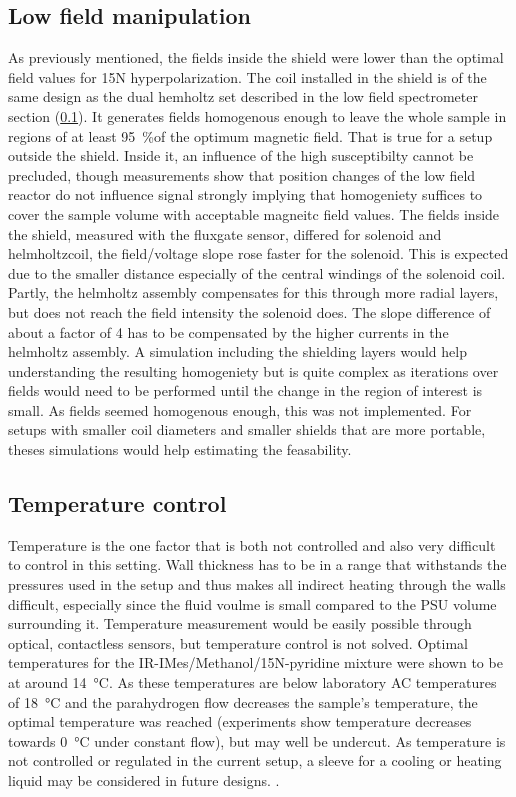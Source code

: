         \subsection{Low field manipulation}
            As previously mentioned, the fields inside the shield were lower than the optimal field values for 15N hyperpolarization. The coil installed in the shield is of the same design as the dual hemholtz set described in the low field spectrometer section (\ref{}). It generates fields homogenous enough to leave the whole sample in regions of at least \SI{95}{\%}of the optimum magnetic field. That is true for a setup outside the shield. Inside it, an influence of the high susceptibilty cannot be precluded, though measurements show that position changes of the low field reactor do not influence signal strongly implying that homogeniety suffices to cover the sample volume with acceptable magneitc field values. The fields inside the shield, measured with the fluxgate sensor, differed for solenoid and helmholtzcoil, the field/voltage slope rose faster for the solenoid. This is expected due to the smaller distance especially of the central windings of the solenoid coil. Partly, the helmholtz assembly compensates for this through more radial layers, but does not reach the field intensity the solenoid does. The slope difference of about a factor of 4 has to be compensated by the higher currents in the helmholtz assembly. A simulation including the shielding layers would help understanding the resulting homogeniety but is quite complex as iterations over fields would need to be performed until the change in the region of interest is small. As fields seemed homogenous enough, this was not implemented. For setups with smaller coil diameters and smaller shields that are more portable, theses simulations would help estimating the feasability.
        \subsection{Temperature control}
            \label{cd:sabreShuttling:tempControl}
            Temperature is the one factor that is both not controlled and also very difficult to control in this setting. Wall thickness has to be in a range that withstands the pressures used in the setup and thus makes all indirect heating through the walls difficult, especially since the fluid voulme is small compared to the PSU volume surrounding it. Temperature measurement would be easily possible through optical, contactless sensors, but temperature control is not solved. Optimal temperatures for the IR-IMes/Methanol/15N-pyridine mixture were shown to be at around \SI{14}{\celsius}. As these temperatures are below laboratory AC temperatures of \SI{18}{\celsius} and the parahydrogen flow decreases the sample's temperature, the optimal temperature was reached (experiments show temperature decreases towards \SI{0}{\celsius} under constant flow), but may well be undercut. As temperature is not controlled or regulated in the current setup, a sleeve for a cooling or heating liquid may be considered in future designs. .
